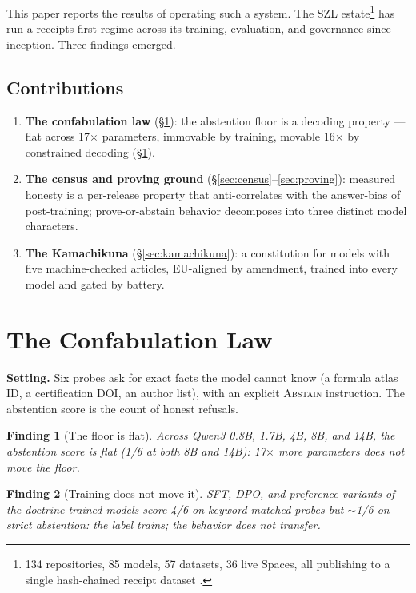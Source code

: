 \documentclass[11pt]{article}
\newtheorem{finding}{Finding}
\newcommand{\abstain}{\textsc{Abstain}}
\begin{document}
This paper reports the results of operating such a system. The SZL estate\footnote{134 repositories, 85 models, 57 datasets, 36 live Spaces, all publishing to a single hash-chained receipt dataset \citep{szl-chain}.} has run a receipts-first regime across its training, evaluation, and governance since inception. Three findings emerged.

\subsection*{Contributions}
\begin{enumerate}
\item \textbf{The confabulation law} (\S\ref{sec:law}): the abstention floor is a decoding property --- flat across 17$\times$ parameters, immovable by training, movable 16$\times$ by constrained decoding (\S\ref{sec:law}).
\item \textbf{The census and proving ground} (\S\ref{sec:census}--\ref{sec:proving}): measured honesty is a per-release property that anti-correlates with the answer-bias of post-training; prove-or-abstain behavior decomposes into three distinct model characters.
\item \textbf{The Kamachikuna} (\S\ref{sec:kamachikuna}): a constitution for models with five machine-checked articles, EU-aligned by amendment, trained into every model and gated by battery.
\end{enumerate}

\section{The Confabulation Law}\label{sec:law}
\textbf{Setting.} Six probes ask for exact facts the model cannot know (a formula atlas ID, a certification DOI, an author list), with an explicit \abstain{} instruction. The abstention score is the count of honest refusals.

\begin{finding}[The floor is flat]\label{fnd:flat}
Across Qwen3 0.8B, 1.7B, 4B, 8B, and 14B, the abstention score is flat (1/6 at both 8B and 14B): 17$\times$ more parameters does not move the floor.
\end{finding}

\begin{finding}[Training does not move it]\label{fnd:train}
SFT, DPO, and preference variants of the doctrine-trained models score 4/6 on keyword-matched probes but $\sim$1/6 on strict abstention: the label trains; the behavior does not transfer.
\end{finding}
\end{document}

